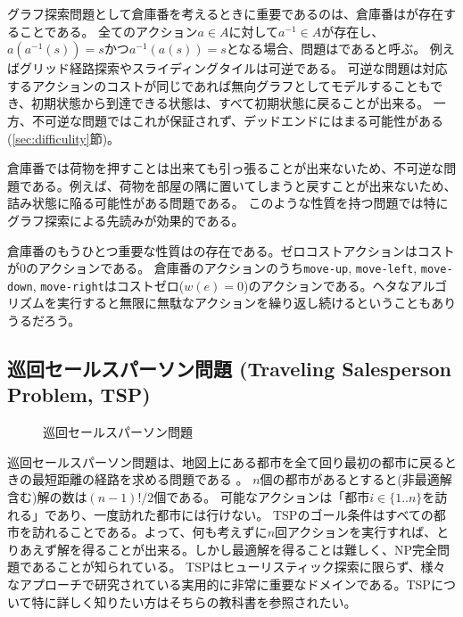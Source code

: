 グラフ探索問題として倉庫番を考えるときに重要であるのは、倉庫番はが存在することである。
全てのアクション$a \in A$に対して$a^{-1} \in A$が存在し、$a(a^{-1}(s)) = s$かつ$a^{-1}(a(s)) = s$となる場合、問題はであると呼ぶ。
例えばグリッド経路探索やスライディングタイルは可逆である。
可逆な問題は対応するアクションのコストが同じであれば無向グラフとしてモデルすることもでき、初期状態から到達できる状態は、すべて初期状態に戻ることが出来る。
一方、不可逆な問題ではこれが保証されず、デッドエンドにはまる可能性がある (\ref{sec:difficulity}節)。

倉庫番では荷物を押すことは出来ても引っ張ることが出来ないため、不可逆な問題である。例えば、荷物を部屋の隅に置いてしまうと戻すことが出来ないため、詰み状態に陥る可能性がある問題である。
このような性質を持つ問題では特にグラフ探索による先読みが効果的である。

倉庫番のもうひとつ重要な性質はの存在である。ゼロコストアクションはコストが0のアクションである。%
倉庫番のアクションのうち{\tt move-up}, {\tt move-left}, {\tt move-down}, {\tt move-right}はコストゼロ($w(e)=0$)のアクションである。ヘタなアルゴリズムを実行すると無限に無駄なアクションを繰り返し続けるということもありうるだろう。


\subsection{巡回セールスパーソン問題 (Traveling Salesperson Problem, TSP)}

\begin{figure}
\centering
\begin{tikzpicture}[scale=0.7]
  
\end{tikzpicture}
\caption{巡回セールスパーソン問題}
\label{fig:sokoban}
\end{figure}


巡回セールスパーソン問題は、地図上にある都市を全て回り最初の都市に戻るときの最短距離の経路を求める問題である \cite{applegate2006traveling}。
$n$個の都市があるとすると(非最適解含む)解の数は$(n-1)!/2$個である。
可能なアクションは「都市$i \in \{1..n\}$を訪れる」であり、一度訪れた都市には行けない。
TSPのゴール条件はすべての都市を訪れることである。よって、何も考えずに$n$回アクションを実行すれば、とりあえず解を得ることが出来る。しかし最適解を得ることは難しく、NP完全問題であることが知られている。
TSPはヒューリスティック探索に限らず、様々なアプローチで研究されている実用的に非常に重要なドメインである\cite{applegate2006traveling}。TSPについて特に詳しく知りたい方はそちらの教科書を参照されたい。


